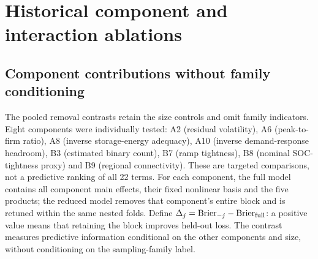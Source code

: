 \section{Historical component and interaction ablations}
\subsection{Component contributions without family conditioning}
\label{sec:p1_components_nofamily}
The pooled removal contrasts retain the size controls and omit family
indicators. Eight components were individually tested: A2 (residual
volatility), A6 (peak-to-firm ratio), A8 (inverse storage-energy adequacy),
A10 (inverse demand-response headroom), B3 (estimated binary count),
B7 (ramp tightness), B8 (nominal SOC-tightness proxy) and B9 (regional connectivity).
These are targeted comparisons, not a predictive ranking of all 22 terms.
For each component, the full model contains all component main effects,
their fixed nonlinear basis and the five products; the reduced model
removes that component's entire block and is retuned within the same
nested folds. Define $\Delta_j=\mathrm{Brier}_{-j}-\mathrm{Brier}_{\rm full}$:
a positive value means that retaining the block improves held-out loss.
The contrast measures predictive information conditional on the other
components and size, without conditioning on the sampling-family label.

